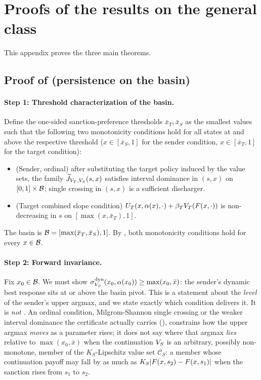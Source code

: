 \section{Proofs of the results on the general class}
\label{app:proofs}

This appendix proves the three main theorems.

\subsection{Proof of  (persistence on the basin)}

\paragraph{Step 1: Threshold characterization of the basin.}
Define the one-sided sanction-preference thresholds
$\bar x_T,\bar x_S$ as the smallest values such that the following two
monotonicity conditions hold for all states at and above the
respective threshold ($x\in[\bar x_S,1]$ for the sender condition,
$x\in[\bar x_T,1]$ for the target condition):
\begin{itemize}
\item (Sender, ordinal) after substituting the target policy induced by
the value sets, the family
$\widetilde J_{V_T,V_S}(s,x)$ satisfies interval dominance in
$(s,x)$ on $[0,1]\times\mathcal{B}$; single crossing in $(s,x)$ is a
sufficient discharger.
\item (Target combined slope condition) $U_T(x,\alpha(x),\cdot)+\beta_TV_T(F(x,\cdot))$
is non-decreasing in $s$ on $[\max(x,\bar x_T),1]$.
\end{itemize}
The basin is $\mathcal{B}=[\max(\bar x_T,\bar x_S),1]$. By
, both monotonicity conditions hold for
every $x\in\mathcal{B}$.

\paragraph{Step 2: Forward invariance.}
Fix $x_0\in\mathcal{B}$. We must show $\sigma^{\mathrm{dyn}}_{V_S}(x_0,\alpha(x_0))
\ge\max(x_0,\bar x)$: the sender's dynamic best response sits at or
above the basin pivot. This is a statement about the \emph{level} of
the sender's upper argmax, and we state exactly
which condition delivers it. It is \emph{not} . An
ordinal condition, Milgrom-Shannon single crossing or the weaker
interval dominance the certificate actually carries (),
constrains how the upper argmax \emph{moves} as a parameter rises;
it does not say where that argmax \emph{lies} relative to
$\max(x_0,\bar x)$ when the continuation $V_S$ is an arbitrary,
possibly non-monotone, member of the $K_S$-Lipschitz value set
$\mathcal C_S$: a member whose continuation payoff may fall by as
much as
$K_S|F(x,s_2)-F(x,s_1)|$ when the sanction rises from $s_1$ to
$s_2$.

